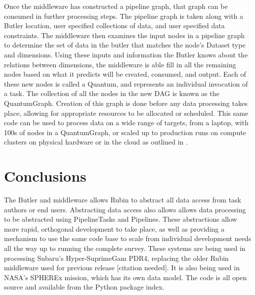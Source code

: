 Once the middleware has constructed a pipeline graph, that graph can be consumed in further processing steps. The pipeline graph is taken along with a Butler location, user specified collections of data, and user specified data constraints.  The middleware then examines the input nodes in a pipeline graph to determine the set of data in the butler that matches the node's Dataset type and dimensions. Using these inputs and information the Butler knows about the relations between dimensions, the middleware is able fill in all the remaining nodes based on what it predicts will be created, consumed, and output. Each of these new nodes is called a Quantum, and represents an individual invocation of a task. The collection of all the nodes in the new DAG is known as the QuantumGraph. Creation of this graph is done before any data processing takes place, allowing for appropriate resources to be allocated or scheduled. This same code can be used to process data on a wide range of targets, from a laptop, with 100s of nodes in a QuantumGraph, or scaled up to production runs on compute clusters on physical hardware or in the cloud as outlined in \citet{P52_adassxxxii}.

\section{Conclusions}
The Butler and middleware allows Rubin to abstract all data access from task authors or end users. Abstracting data access also allows allows data processing to be abstracted using PipelineTasks and Pipelines. These abstractions allow more rapid, orthogonal development to take place, as well as providing a mechanism to use the same code base to scale from individual development needs all the way up to running the complete survey. These systems are being used in processing Subaru's Hyper-SuprimeGam PDR4, replacing the older Rubin middleware used for previous release [citation needed]. It is also being used in NASA's SPHEREx mission, which has its own data model. The code is all open source and available from the Python package index.

\vskip 0.4in
